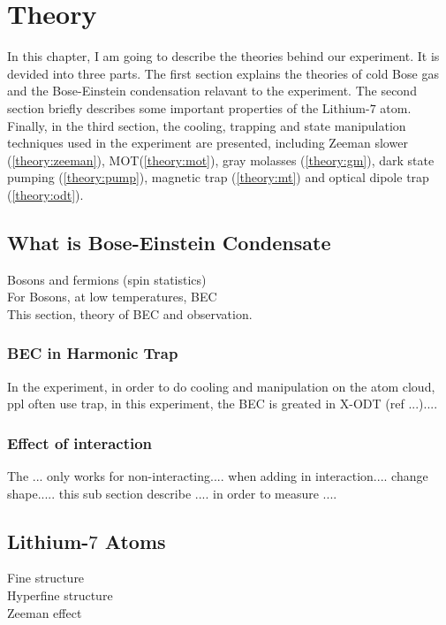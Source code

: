\chapter{Theory}

In this chapter, I am going to describe the theories behind our experiment. It is devided into three parts. The first section explains the theories of cold Bose gas and the Bose-Einstein condensation relavant to the experiment. The second section briefly describes some important properties of the Lithium-$7$ atom. Finally, in the third section, the cooling, trapping and state manipulation techniques used in the experiment are presented, including Zeeman slower (\ref{theory:zeeman}), MOT(\ref{theory:mot}), gray molasses (\ref{theory:gm}), dark state pumping (\ref{theory:pump}), magnetic trap (\ref{theory:mt}) and optical dipole trap (\ref{theory:odt}).

\section{What is Bose-Einstein Condensate}\label{theory:bec}

Bosons and fermions (spin statistics\cite{spin-statistics1,spin-statistics2})\\
For Bosons, at low temperatures, BEC\\
This section, theory of BEC and observation.

\subsection{BEC in Harmonic Trap}

In the experiment, in order to do cooling and manipulation on the atom cloud, ppl often use trap, in this experiment, the BEC is greated in X-ODT (ref ...)....

\subsection{Effect of interaction}

The ... only works for non-interacting.... when adding in interaction.... change shape..... this sub section describe .... in order to measure ....

\section{Lithium-$7$ Atoms}

Fine structure\\
Hyperfine structure\\
Zeeman effect

